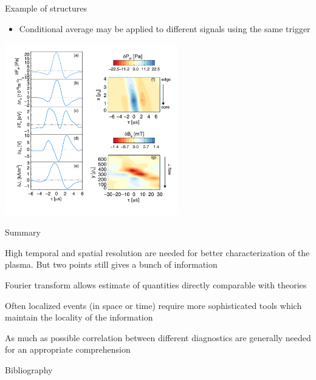 \documentclass[t,10pt]{beamer}
\begin{document}
\begin{frame}{Example of structures}
\begin{itemize}
\item Conditional average may be applied to different signals using
  the same trigger {\footnotesize\parencite{Vianello:2010tv,Martines:2009im}}
\end{itemize}

\begin{center}
\includegraphics[height=7.5cm]{strutturaMediaConVpNuova}
\end{center}


\end{frame}



\begin{frame}{Summary}
\begin{itemize}
{\large\item High temporal and spatial resolution are needed for better
  characterization of the plasma. But two points still gives a bunch
  of information
\item Fourier transform allows estimate of quantities directly
  comparable with theories
\item Often localized events (in space or time) require more
  sophisticated tools which maintain the locality of the information
\item As much as possible correlation between different diagnostics
  are generally needed for an appropriate comprehension}
\end{itemize}

\end{frame}
\begin{frame}[allowframebreaks]{Bibliography}
\printbibliography
\end{frame}
\end{document}
